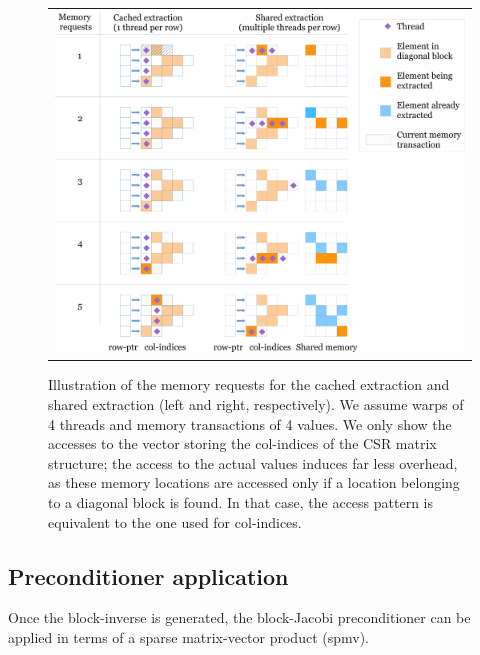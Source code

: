 \begin{figure}
\begin{center}
\begin{tabular}{r}
\includegraphics[width=.85\columnwidth]{plots/shared_extraction_legend}
\end{tabular}
\end{center}
\caption{Illustration of the memory requests for the cached extraction and shared extraction (left and right, respectively).
We assume warps of 4 threads and memory transactions of 4 values.
We only show the accesses to the vector storing the {\sf col-indices} of the CSR matrix structure; 
the access to the actual values induces far less overhead,
as these memory locations are accessed only if a location belonging to a diagonal block is found.
In that case, the access pattern is equivalent to the one used for {\sf col-indices}.
}
\label{2017-gje-block-jacobi:fig:memtransact}
\end{figure}

\subsection{Preconditioner application}
\label{2017-gje-block-jacobi:sec:precapply}
Once the block-inverse is generated,
the block-Jacobi preconditioner can be applied in terms 
of a sparse matrix-vector product
({\sc spmv}).

